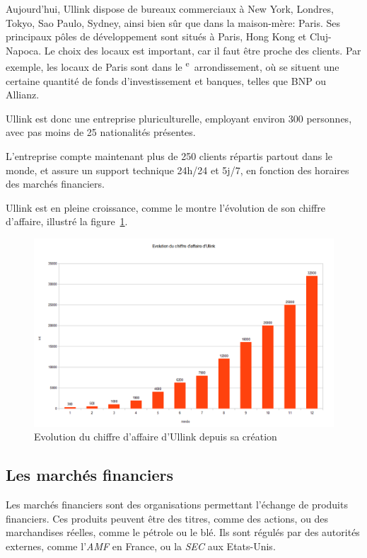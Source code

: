 \documentclass[a4paper, 12pt]{article}
\begin{document}
Aujourd'hui, Ullink dispose de bureaux commerciaux à New York, Londres, Tokyo, Sao Paulo, Sydney, ainsi bien sûr que dans la maison-mère: Paris. Ses principaux pôles de développement sont situés à Paris, Hong Kong et Cluj-Napoca. Le choix des locaux est important, car il faut être proche des clients. Par exemple, les locaux de Paris sont dans le \textsc{}\textsuperscript{e}~arrondissement, où se situent une certaine quantité de fonds d'investissement et banques, telles que BNP ou Allianz.

Ullink est donc une entreprise pluriculturelle, employant environ 300 personnes, avec pas moins de 25 nationalités présentes.

L'entreprise compte maintenant plus de 250 clients répartis partout dans le monde, et assure un support technique 24h/24 et 5j/7, en fonction des horaires des marchés financiers.

Ullink est en pleine croissance, comme le montre l'évolution de son chiffre d'affaire, illustré la figure~\ref{ca_ullink}.

\begin{figure}
\includegraphics[width=\textwidth]{ca_ullink.png}
\caption{Evolution du chiffre d'affaire d'Ullink depuis sa création}
\label{ca_ullink}
\end{figure}

\subsection{Les marchés financiers}

Les marchés financiers sont des organisations permettant l'échange de produits financiers. Ces produits peuvent être des titres, comme des actions, ou des marchandises réelles, comme le pétrole ou le blé. Ils sont régulés par des autorités externes, comme l'\emph{AMF} en France, ou la \emph{SEC} aux Etats-Unis.
\end{document}
